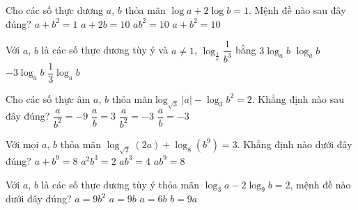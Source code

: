 \begin{ex}%
	Cho các số thực dương $a$, $b$ thỏa mãn $\log a+2\log  b=1$. Mệnh đề nào sau đây đúng?
	\choice 
		{$a+b^2=1$} 
		 {$a+2b=10$}
		 {\True $ab^2=10$}
		{$a+b^2=10$} 
\end{ex}

\begin{ex}%
	Với $a$, $b$ là các số thực dương tùy ý và $a \ne 1$,  $\log_{\tfrac{1}{a}}\dfrac{1}{b^3}$ bằng
	\choice 
		{\True  $3\log_a b$}
		{$\log_a b$} 
		{$-3\log_a b$} 
		{$\dfrac{1}{3}\log_a b$} 
\end{ex}

\begin{ex}%
	Cho các số thực âm $a$, $b$ thỏa mãn$\log_{\sqrt 3}|a|-\log_3b^2=2$. Khẳng  định nào sau đây đúng?
	 \choice
		{$\dfrac{a}{b^2}=-9$} 
		{\True  $\dfrac{a}{b}=3$}
		 {$\dfrac{a}{b^2}=-3$}
		 {$\dfrac{a}{b}=-3$}
\end{ex}

\begin{ex}%
	Với  mọi $a$, $b$ thỏa mãn $\log_{\sqrt 2}(2a)+\log_8(b^9)=3$. Khẳng định nào dưới đây đúng?
	\choice 
		 {$a+b^9=8$}
		{\True  $a^2b^3=2$}
		{$ab^3=4$} 
		{$ab^9=8$} 
\end{ex}

\begin{ex}%
	Với  $a$, $b$ là các số thực dương tùy ý thỏa mãn $\log_3a-2\log_9b=2$, mệnh đề nào dưới đây đúng?
	\choice 
		 {$a=9b^2$}
		 {\True $a=9b$}
		 {$a=6b$}
		 {$b=9a$}
\end{ex}

